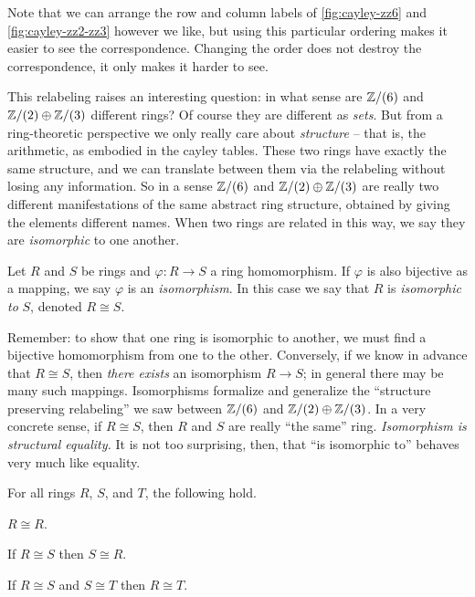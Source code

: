 Note that we can arrange the row and column labels of \autoref{fig:cayley-zz6} and \autoref{fig:cayley-zz2-zz3} however we like, but using this particular ordering makes it easier to see the correspondence.
Changing the order does not destroy the correspondence, it only makes it harder to see.

This relabeling raises an interesting question: in what sense are \(\mathbb{Z}/(6)\) and \(\mathbb{Z}/(2) \oplus \mathbb{Z}/(3)\) different rings?
Of course they are different as \emph{sets}.
But from a ring-theoretic perspective we only really care about \emph{structure} -- that is, the arithmetic, as embodied in the cayley tables.
These two rings have exactly the same structure, and we can translate between them via the relabeling without losing any information.
So in a sense \(\mathbb{Z}/(6)\) and \(\mathbb{Z}/(2) \oplus \mathbb{Z}/(3)\) are really two different manifestations of the same abstract ring structure, obtained by giving the elements different names.
When two rings are related in this way, we say they are \emph{isomorphic} to one another.

\begin{dfn} \label{dfn:isomorphism}
Let \(R\) and \(S\) be rings and \(\varphi : R \rightarrow S\) a ring homomorphism.
If \(\varphi\) is also bijective as a mapping, we say \(\varphi\) is an \emph{isomorphism}.
In this case we say that \(R\) is \emph{isomorphic to} \(S\), denoted \(R \cong S\).
\end{dfn}

Remember: to show that one ring is isomorphic to another, we must find a bijective homomorphism from one to the other.
Conversely, if we know in advance that \(R \cong S\), then \emph{there exists} an isomorphism \(R \rightarrow S\); in general there may be many such mappings.
Isomorphisms formalize and generalize the ``structure preserving relabeling'' we saw between \(\mathbb{Z}/(6)\) and \(\mathbb{Z}/(2) \oplus \mathbb{Z}/(3)\).
In a very concrete sense, if \(R \cong S\), then \(R\) and \(S\) are really ``the same'' ring.
\emph{Isomorphism is structural equality.}
It is not too surprising, then, that ``is isomorphic to'' behaves very much like equality.

\begin{prop} \label{prop:iso-equiv}
For all rings \(R\), \(S\), and \(T\), the following hold.
\begin{proplist*}
\item \label{prop:iso-equiv:refl} \(R \cong R\).
\item \label{prop:iso-equiv:symm} If \(R \cong S\) then \(S \cong R\).
\item \label{prop:iso-equiv:trans} If \(R \cong S\) and \(S \cong T\) then \(R \cong T\).
\end{proplist*}
\end{prop}

